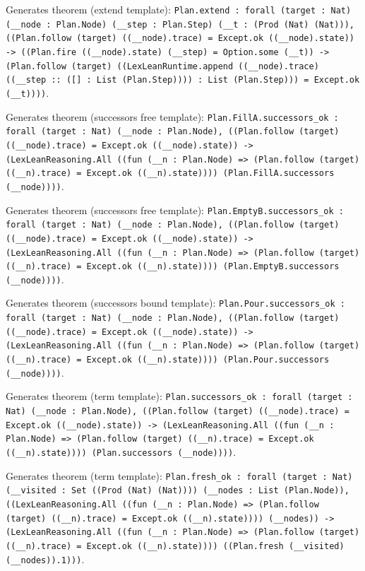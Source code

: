 \documentclass[11pt]{article}
\begin{document}
\noindent Generates theorem (extend template): \texttt{Plan.extend : forall (target : Nat) (\_\_node : Plan.Node) (\_\_step : Plan.Step) (\_\_t : (Prod (Nat) (Nat))), ((Plan.follow (target) ((\_\_node).trace) = Except.ok ((\_\_node).state)) -> ((Plan.fire ((\_\_node).state) (\_\_step) = Option.some (\_\_t)) -> (Plan.follow (target) ((LexLeanRuntime.append ((\_\_node).trace) ((\_\_step :: ([] : List (Plan.Step)))) : List (Plan.Step))) = Except.ok (\_\_t))))}.\par
\noindent Generates theorem (successors free template): \texttt{Plan.FillA.successors\_ok : forall (target : Nat) (\_\_node : Plan.Node), ((Plan.follow (target) ((\_\_node).trace) = Except.ok ((\_\_node).state)) -> (LexLeanReasoning.All ((fun (\_\_n : Plan.Node) => (Plan.follow (target) ((\_\_n).trace) = Except.ok ((\_\_n).state)))) (Plan.FillA.successors (\_\_node))))}.\par
\noindent Generates theorem (successors free template): \texttt{Plan.EmptyB.successors\_ok : forall (target : Nat) (\_\_node : Plan.Node), ((Plan.follow (target) ((\_\_node).trace) = Except.ok ((\_\_node).state)) -> (LexLeanReasoning.All ((fun (\_\_n : Plan.Node) => (Plan.follow (target) ((\_\_n).trace) = Except.ok ((\_\_n).state)))) (Plan.EmptyB.successors (\_\_node))))}.\par
\noindent Generates theorem (successors bound template): \texttt{Plan.Pour.successors\_ok : forall (target : Nat) (\_\_node : Plan.Node), ((Plan.follow (target) ((\_\_node).trace) = Except.ok ((\_\_node).state)) -> (LexLeanReasoning.All ((fun (\_\_n : Plan.Node) => (Plan.follow (target) ((\_\_n).trace) = Except.ok ((\_\_n).state)))) (Plan.Pour.successors (\_\_node))))}.\par
\noindent Generates theorem (term template): \texttt{Plan.successors\_ok : forall (target : Nat) (\_\_node : Plan.Node), ((Plan.follow (target) ((\_\_node).trace) = Except.ok ((\_\_node).state)) -> (LexLeanReasoning.All ((fun (\_\_n : Plan.Node) => (Plan.follow (target) ((\_\_n).trace) = Except.ok ((\_\_n).state)))) (Plan.successors (\_\_node))))}.\par
\noindent Generates theorem (term template): \texttt{Plan.fresh\_ok : forall (target : Nat) (\_\_visited : Set ((Prod (Nat) (Nat)))) (\_\_nodes : List (Plan.Node)), ((LexLeanReasoning.All ((fun (\_\_n : Plan.Node) => (Plan.follow (target) ((\_\_n).trace) = Except.ok ((\_\_n).state)))) (\_\_nodes)) -> (LexLeanReasoning.All ((fun (\_\_n : Plan.Node) => (Plan.follow (target) ((\_\_n).trace) = Except.ok ((\_\_n).state)))) ((Plan.fresh (\_\_visited) (\_\_nodes)).1)))}.\par
\end{document}
